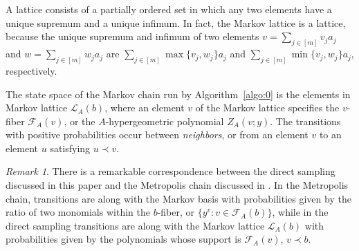 \documentclass[a4paper,12pt]{article}
\theoremstyle{plain}
\theoremstyle{remark}
\newtheorem{remark}[theorem]{Remark}
\begin{document}
A lattice consists of a partially ordered set in which any two
elements have a unique supremum and a unique infimum. In fact,
the Markov lattice is a lattice, because the unique supremum and
infimum of two elements $v=\sum_{j\in[m]}v_ja_j$ and
$w=\sum_{j\in[m]}w_ja_j$ are $\sum_{j\in[m]}\max\{v_j,w_j\}a_j$
and $\sum_{j\in[m]}\min\{v_j,w_j\}a_j$, respectively.

The state space of the Markov chain run by Algorithm~\ref{algo:0}
is the elements in Markov lattice $\mathcal{L}_A(b)$, where
an element $v$ of the Markov lattice specifies the $v$-fiber
$\mathcal{F}_A(v)$, or the $A$-hypergeometric polynomial $Z_A(v;y)$.
The transitions with positive probabilities occur between
{\it neighbors}, or from an element $v$ to an element $u$ satisfying
$u\prec v$.

\begin{remark}
There is a remarkable correspondence between the direct sampling
discussed in this paper and the Metropolis chain discussed in
\cite{DS98}. In the Metropolis chain, transitions are along with
the Markov basis with probabilities given by the ratio of two
monomials within the $b$-fiber, or $\{y^v:v\in\mathcal{F}_A(b)\}$,
while in the direct sampling transitions are along with
the Markov lattice $\mathcal{L}_A(b)$ with probabilities given
by the polynomials whose support is $\mathcal{F}_A(v)$, $v\prec b$. 
\end{remark}
\end{document}
